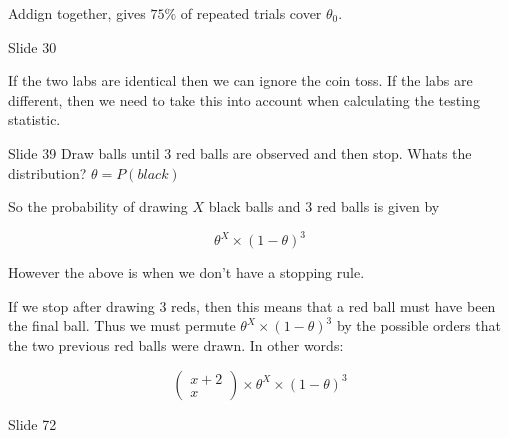 \documentclass{article}
\begin{document}
Addign together, gives $75 \%$ of repeated trials cover $\theta_{0}$.






\begin{problem}{Slide 30}
\end{problem}

If the two labs are identical then we can ignore the coin toss. 
If the labs are different, then we need to take this into account when calculating the testing statistic.

\begin{problem}{Slide 39}
Draw balls until 3 red balls are observed and then stop.
Whats the distribution? $\theta =P(black)$
\end{problem}

So the probability of drawing $X$ black balls and $3$ red balls is given by

$$
\theta ^ X \times (1-\theta)^3
$$

However the above is when we don't have a stopping rule. 

If we stop after drawing 3 reds, then this means that a red ball must have been the final ball. Thus we must permute $\theta ^ X \times (1-\theta)^3$ by the possible orders that the two previous red balls were drawn. In other words:

$$
\left(\begin{array}{c}x+2 \\ x\end{array}\right)\times \theta ^ X \times (1-\theta)^3
$$
\begin{problem}{Slide 72}
\end{problem}
\end{document}
